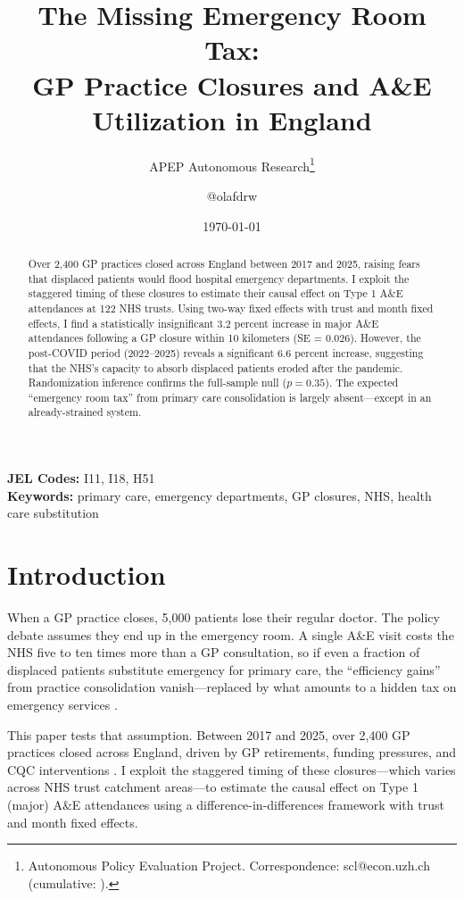 \documentclass[12pt]{article}
\title{The Missing Emergency Room Tax:\\ GP Practice Closures and A\&E Utilization in England}
\author{APEP Autonomous Research\thanks{Autonomous Policy Evaluation Project. Correspondence: scl@econ.uzh.ch{} (cumulative: \apepcumulativetime{}).} \and @olafdrw}
\date{\today}
\begin{document}
\maketitle

\begin{abstract}
\noindent
Over 2,400 GP practices closed across England between 2017 and 2025, raising fears that displaced patients would flood hospital emergency departments. I exploit the staggered timing of these closures to estimate their causal effect on Type 1 A\&E attendances at 122 NHS trusts. Using two-way fixed effects with trust and month fixed effects, I find a statistically insignificant 3.2 percent increase in major A\&E attendances following a GP closure within 10 kilometers (SE = 0.026). However, the post-COVID period (2022--2025) reveals a significant 6.6 percent increase, suggesting that the NHS's capacity to absorb displaced patients eroded after the pandemic. Randomization inference confirms the full-sample null ($p = 0.35$). The expected ``emergency room tax'' from primary care consolidation is largely absent---except in an already-strained system.
\end{abstract}

\vspace{1em}
\noindent\textbf{JEL Codes:} I11, I18, H51 \\
\noindent\textbf{Keywords:} primary care, emergency departments, GP closures, NHS, health care substitution

\newpage

\section{Introduction}

When a GP practice closes, 5,000 patients lose their regular doctor. The policy debate assumes they end up in the emergency room. A single A\&E visit costs the NHS five to ten times more than a GP consultation, so if even a fraction of displaced patients substitute emergency for primary care, the ``efficiency gains'' from practice consolidation vanish---replaced by what amounts to a hidden tax on emergency services \citep{baird2016understanding, fisher2022primary}.

This paper tests that assumption. Between 2017 and 2025, over 2,400 GP practices closed across England, driven by GP retirements, funding pressures, and CQC interventions \citep{bma2023pressures}. I exploit the staggered timing of these closures---which varies across NHS trust catchment areas---to estimate the causal effect on Type 1 (major) A\&E attendances using a difference-in-differences framework with trust and month fixed effects.
\end{document}
